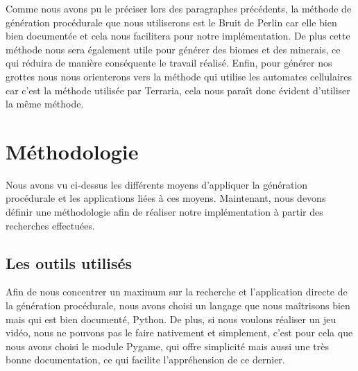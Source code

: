 \documentclass[12pt]{article}
\begin{document}
Comme nous avons pu le préciser lors des paragraphes précédents, la méthode de génération procédurale que nous utiliserons est le Bruit de Perlin car elle bien bien documentée et cela nous facilitera pour notre implémentation. De plus cette méthode nous sera également utile pour générer des biomes et des minerais, ce qui réduira de manière conséquente le travail réalisé. Enfin, pour générer nos grottes nous nous orienterons vers la méthode qui utilise les automates cellulaires car c'est la méthode utilisée par Terraria, cela nous paraît donc évident d'utiliser la même méthode. 
\newpage
\section{Méthodologie}

Nous avons vu ci-dessus les différents moyens d'appliquer la génération procédurale et les applications liées à ces moyens. Maintenant, nous devons définir une méthodologie afin de réaliser notre implémentation à partir des recherches effectuées.

\subsection{Les outils utilisés}

Afin de nous concentrer un maximum sur la recherche et l'application directe de la génération procédurale, nous avons choisi un langage que nous maîtrisons bien mais qui est bien documenté, Python. De plus, si nous voulons réaliser un jeu vidéo, nous ne pouvons pas le faire nativement et simplement, c'est pour cela que nous avons choisi le module Pygame, qui offre simplicité mais aussi une très bonne documentation, ce qui facilite l’appréhension de ce dernier.\par
\end{document}
